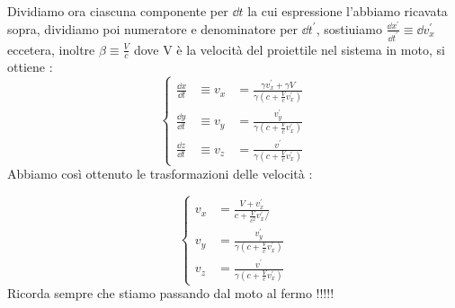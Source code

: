 Dividiamo ora ciascuna componente per $\dd{t}$ la cui espressione l'abbiamo ricavata sopra, dividiamo poi numeratore e denominatore per $\dd{t^{\prime}}$, sostiuiamo $ \frac{\dd{x^{\prime}}}{\dd{t^{\prime}}} \equiv \dd{v^{\prime}_{x}} $ eccetera, inoltre $\beta \equiv \frac{V}{c}$ 
dove V è la velocità del proiettile nel sistema in moto, si ottiene : 
\newpage
\begin{equation*}
        \left\{ \begin{aligned}
                        \frac{\dd{x}}{\dd{t}} &\equiv v_{x}&= \frac{\gamma v^{\prime}_{x} + \gamma V}{\gamma(c + \frac{V}{c}v^{\prime}_{x})} \\
                        \frac{\dd{y}}{\dd{t}} &\equiv v_{y}&= \frac{v^{\prime}_{y}}{\gamma(c + \frac{V}{c}v^{\prime}_{x})} \\
                        \frac{\dd{z}}{\dd{t}} &\equiv v_{z}&= \frac{v^{\prime}}{\gamma(c + \frac{V}{c}v^{\prime}_{x})}
            \end{aligned}
            \right.
\end{equation*}
Abbiamo così ottenuto le trasformazioni delle velocità : 
\begin{tcolorbox}[colback=red!5!white,colframe=red!50!black,title=ATTENZIONE !]
        \begin{equation*}
                \left\{ \begin{aligned}
                                v_{x} &= \frac{V + v^{\prime}_{x}}{c + \frac{V}{c^{2}}v^{\prime}_{x}/}\\
                                v_{y} &= \frac{v^{\prime}_{y}}{\gamma(c + \frac{V}{c}v^{\prime}_{x})} \\
                                v_{z}&= \frac{v^{\prime}}{\gamma(c + \frac{V}{c}v^{\prime}_{x})}
                        \end{aligned}
                        \right.
        \end{equation*}
        Ricorda sempre che stiamo passando dal moto al fermo !!!!!
\end{tcolorbox}
\newpage
